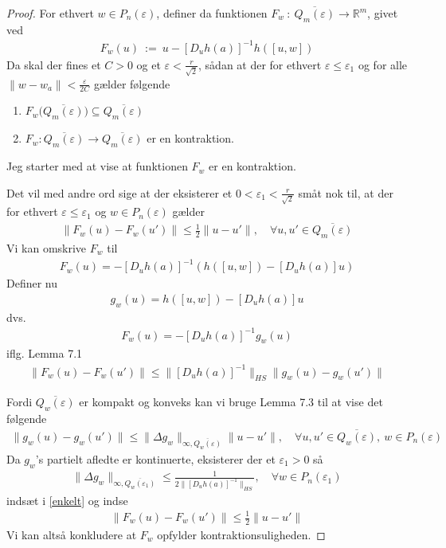 \begin{proof}
  For ethvert $w \in P_n(\varepsilon)$, definer da funktionen $F_w \ : \ \overline{Q_m(\varepsilon)} \rightarrow \mathbb{R}^m$, givet ved
  \begin{align*}
    F_w(u) \ := \ u - [D_u h(a)]^{-1} h([u,w])
  \end{align*}
  Da skal der fines et $C > 0$ og et $\varepsilon < \frac{r}{\sqrt{2}}$, sådan at der for ethvert $\varepsilon \leq \varepsilon_1$ og for alle $\|w - w_a\| < \frac{\varepsilon}{2C}$ gælder følgende
  \begin{enumerate}[label = \arabic*.]
    \item $F_w\bigg( \overline{Q_m(\varepsilon)} \bigg) \subseteq \overline{Q_m(\varepsilon)}$
    \item $F_w : \overline{Q_m(\varepsilon)} \rightarrow \overline{Q_m(\varepsilon)}$ er en kontraktion.
  \end{enumerate}

  Jeg starter med at vise at funktionen $F_w$ er en kontraktion.

  Det vil med andre ord sige at der eksisterer et $0 < \varepsilon_1 < \frac{r}{\sqrt{2}}$ småt nok til, at der for ethvert $\varepsilon \leq \varepsilon_1$ og $w \in P_n(\varepsilon)$ gælder
  \begin{align}\label{enkelt}
    \| F_w(u) - F_w(u') \| \leq \frac{1}{2} \| u - u' \|, \quad \forall u,u' \in \overline{Q_m(\varepsilon)}
  \end{align}
  Vi kan omskrive $F_w$ til
  \begin{align*}
    F_w(u) = -[D_uh(a)]^{-1}(h([u,w]) - [D_uh(a)]u)
  \end{align*}
  Definer nu
  \begin{align*}
    g_w(u) = h([u,w]) - [D_uh(a)]u
  \end{align*}
  dvs.
  \begin{align*}
    F_w(u) = -[D_uh(a)]^{-1}g_w(u)
  \end{align*}
  iflg. Lemma 7.1
  \begin{align*}
    \| F_w(u) - F_w(u') \| \leq \|[D_uh(a)]^{-1} \|_{HS} \| g_w(u) - g_w(u') \|
  \end{align*}

  Fordi $\overline{Q_w(\varepsilon)}$ er kompakt og konveks kan vi bruge Lemma 7.3 til at vise det følgende
  \begin{align*}
    \| g_w(u) - g_w(u') \| \leq \| \Delta g_w \|_{\infty, \overline{Q_w(\varepsilon)}} \| u - u' \|, \quad \forall u, u' \in \overline{Q_w(\varepsilon)}, \ w \in P_n(\varepsilon)
  \end{align*}
  Da $g_w$'s partielt afledte er kontinuerte, eksisterer der et $\varepsilon_1 > 0$ så
  \begin{align*}
    \| \Delta g_w \|_{\infty, \overline{Q_w(\varepsilon_1)}} \leq \frac{1}{2\| [D_uh(a)]^{-1} \|_{HS}}, \quad \forall w \in P_n(\varepsilon_1)
  \end{align*}
  indsæt i \eqref{enkelt} og indse
  \begin{align}\label{tredobbelt}
    \| F_w(u) - F_w(u') \| \leq \frac{1}{2} \| u - u' \|
  \end{align}
  Vi kan altså konkludere at $F_w$ opfylder kontraktionsuligheden.


\end{proof}
